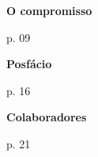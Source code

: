 \thispagestyle{empty}


\begin{vplace}
\begin{centering}
\textbf{O compromisso}

\medskip

p. 09

\medskip

\textbf{Posfácio}

\medskip

p. 16

\medskip

\textbf{Colaboradores}

\medskip

p. 21

\end{centering}
\end{vplace}